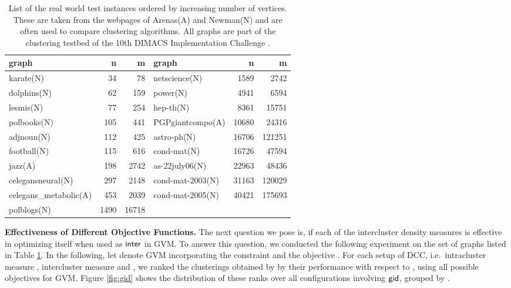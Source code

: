 \documentclass{llncs}
\newcommand{\measure}[1]{\ensuremath{\text{\normalfont{\sffamily {#1}}}}\xspace}
\newcommand{\andreapar}{\vspace*{.5ex}\par\noindent}
\begin{document}
\begin{footnotesize}
\begin{table}
\footnotesize
    \begin{center}
	\begin{tabular}{|l|r|r||l|r|r|}
	\hline
	graph & n & m & graph & n & m\\
	\hline
	\hline
	karate(N) & 34 & 78 & netscience(N) & 1589 & 2742 \\
    dolphins(N) & 62 & 159 & power(N) & 4941 & 6594 \\
    lesmis(N) & 77 & 254 & hep-th(N) & 8361 & 15751 \\
    polbooks(N) & 105 & 441 & PGPgiantcompo(A) & 10680 & 24316\\
    adjnoun(N) & 112 & 425 & astro-ph(N) & 16706 & 121251\\
    football(N) & 115 & 616 & cond-mat(N) & 16726 & 47594\\
    jazz(A) & 198 & 2742 & as-22july06(N) & 22963 & 48436\\
    celegansneural(N) & 297 & 2148 & cond-mat-2003(N) & 31163 & 120029\\
    celegans\_metabolic(A) & 453 & 2039 & cond-mat-2005(N) & 40421 & 175693\\
    polblogs(N) & 1490 & 16718 &  &  &\\
	\hline
	\end{tabular}
	\end{center}
	\caption{List of the real world test instances ordered by increasing number of vertices. These are taken from the webpages of Arenas(A) \cite{arenasWS} and Newman(N) \cite{newmanWS} and are often used to compare clustering algorithms. All graphs are part of the clustering testbed of the 10th DIMACS Implementation Challenge \cite{dimacsWS}.}
	\label{tab:real_world_graphs}
\end{table}
\end{footnotesize}
\normalsize
\andreapar\textbf{Effectiveness of Different Objective Functions.}
The next question we pose is, if each of the intercluster density measures is effective in optimizing itself when used as \measure{inter} in GVM. To answer this question, we conducted the following experiment on the set of
graphs listed in Table \ref{tab:real_world_graphs}.
In the following, let  denote GVM incorporating the constraint  and the objective .
For each setup of DCC, i.e.~intracluster measure , intercluster measure  and , we ranked the clusterings obtained by  by their performance with respect to , using all possible objectives  for GVM.
Figure \ref{fig:gid} shows the distribution of these ranks over all configurations involving \measure{gid}, grouped by . 
\end{document}
